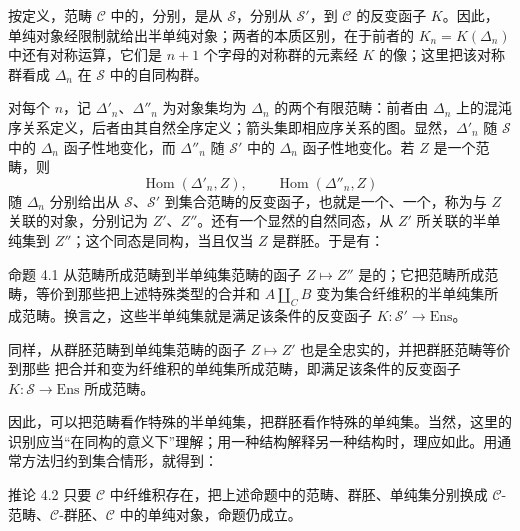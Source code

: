 按定义，范畴 $\mathcal C$ 中的，分别，是从 $\mathcal S$，分别从 $\mathcal S'$，到 $\mathcal C$ 的反变函子 $K$。因此，单纯对象经限制就给出半单纯对象；两者的本质区别，在于前者的 $K_n=K(\Delta_n)$ 中还有对称运算，它们是 $n+1$ 个字母的对称群的元素经 $K$ 的像；这里把该对称群看成 $\Delta_n$ 在 $\mathcal S$ 中的自同构群。

对每个 $n$，记 $\Delta'_n$、$\Delta''_n$ 为对象集均为 $\Delta_n$ 的两个有限范畴：前者由 $\Delta_n$ 上的混沌序关系定义，后者由其自然全序定义；箭头集即相应序关系的图。显然，$\Delta'_n$ 随 $\mathcal S$ 中的 $\Delta_n$ 函子性地变化，而 $\Delta''_n$ 随 $\mathcal S'$ 中的 $\Delta_n$ 函子性地变化。若 $Z$ 是一个范畴，则
\[
 \operatorname{Hom}(\Delta'_n,Z),\qquad
 \operatorname{Hom}(\Delta''_n,Z)
\]
随 $\Delta_n$ 分别给出从 $\mathcal S$、$\mathcal S'$ 到集合范畴的反变函子，也就是一个、一个，称为与 $Z$ 关联的对象，分别记为 $Z'$、$Z''$。还有一个显然的自然同态，从 $Z'$ 所关联的半单纯集到 $Z''$；这个同态是同构，当且仅当 $Z$ 是群胚。于是有：

\begin{statement}{命题 4.1}
从范畴所成范畴到半单纯集范畴的函子 $Z\mapsto Z''$ 是的；它把范畴所成范畴，等价到那些把上述特殊类型的合并和 $A\amalg_CB$ 变为集合纤维积的半单纯集所成范畴。换言之，这些半单纯集就是满足该条件的反变函子 $K:\mathcal S'\to\mathrm{Ens}$。

同样，从群胚范畴到单纯集范畴的函子 $Z\mapsto Z'$ 也是全忠实的，并把群胚范畴等价到那些
把合并和变为纤维积的单纯集所成范畴，即满足该条件的反变函子 $K:\mathcal S\to\mathrm{Ens}$ 所成范畴。
\end{statement}

因此，可以把范畴看作特殊的半单纯集，把群胚看作特殊的单纯集。当然，这里的识别应当“在同构的意义下”理解；用一种结构解释另一种结构时，理应如此。用通常方法归约到集合情形，就得到：

\begin{statement}{推论 4.2}
只要 $\mathcal C$ 中纤维积存在，把上述命题中的范畴、群胚、单纯集分别换成 $\mathcal C$-范畴、$\mathcal C$-群胚、$\mathcal C$ 中的单纯对象，命题仍成立。
\end{statement}

